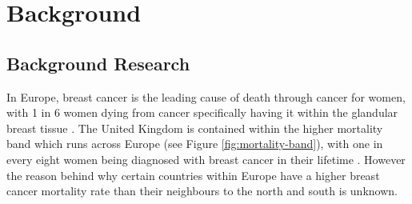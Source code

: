 \chapter{Background}

\section{Background Research}


In Europe, breast cancer is the leading cause of death through cancer for women, with 1 in 6 women dying from cancer specifically having it within the glandular breast tissue \cite{European_Commission_2009}. The United Kingdom is contained within the higher mortality band which runs across Europe (see Figure \ref{fig:mortality-band}), with one in every eight women being diagnosed with breast cancer in their lifetime \cite{Breast_cancer_statistics_2015}. However the reason behind why certain countries within Europe have a higher breast cancer mortality rate than their neighbours to the north and south is unknown.

